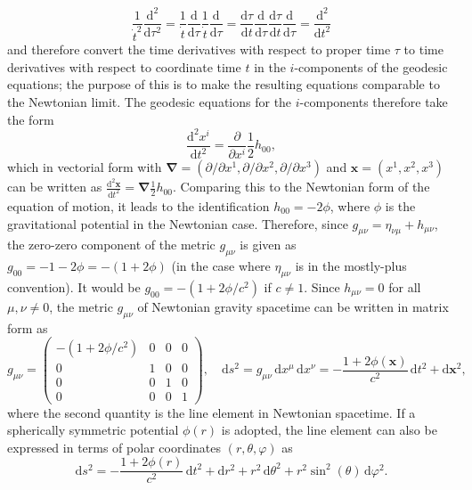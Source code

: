 \documentclass[a4paper,11pt]{article}
\numberwithin{equation}{section}
\newcommand\vect[1]{\ensuremath{\bm{#1}}}
\begin{document}
{\begin{equation}
\frac{1}{\dot{t}^2}\frac{\mathrm{d}^2}{\mathrm{d}\tau^2} = \frac{1}{\dot{t}}\frac{\mathrm{d}}{\mathrm{d}\tau}\frac{1}{\dot{t}}\frac{\mathrm{d}}{\mathrm{d}\tau} = \frac{\mathrm{d}\tau}{\mathrm{d}t}\frac{\mathrm{d}}{\mathrm{d}\tau}\frac{\mathrm{d}\tau}{\mathrm{d}t}\frac{\mathrm{d}}{\mathrm{d}\tau} = \frac{\mathrm{d}^2}{\mathrm{d}t^2}
\end{equation} and therefore convert the time derivatives with respect to proper time $\tau$ to time derivatives with respect to coordinate time $t$ in the $i$-components of the geodesic equations; the purpose of this is to make the resulting equations comparable to the Newtonian limit. The geodesic equations for the $i$-components therefore take the form \begin{equation}
\frac{\mathrm{d}^2x^i}{\mathrm{d}t^2} = \frac{\partial}{\partial x^i} \frac{1}{2}h_{00}, 
\end{equation} which in vectorial form with $\vect{\nabla} = (\partial/\partial x^1, \partial/\partial x^2, \partial/\partial x^3)$ and $\vect{x} = (x^1,x^2,x^3)$ can be written as $\frac{\mathrm{d}^2\vect{x}}{\mathrm{d}t^2} = \vect{\nabla}\frac{1}{2}h_{00}$. Comparing this to the Newtonian form of the equation of motion, it leads to the identification $h_{00} = -2\phi$, where $\phi$ is the gravitational potential in the Newtonian case. Therefore, since $g_{\mu\nu} = \eta_{\nu\mu} + h_{\mu\nu}$, the zero-zero component of the metric $g_{\mu\nu}$ is given as $g_{00} = -1 -2\phi = -(1+2\phi)$ (in the case where $\eta_{\mu\nu}$ is in the mostly-plus convention). It would be $g_{00} = -(1+2\phi/c^2)$ if $c \neq 1$. Since $h_{\mu\nu} = 0$ for all $\mu,\nu \neq 0$, the metric $g_{\mu\nu}$ of Newtonian gravity spacetime can be written in matrix form as \begin{equation}
g_{\mu\nu} = \begin{pmatrix}
-(1+2\phi/c^2) & 0 & 0 & 0 \\
0 & 1 & 0 & 0 \\
0 & 0 & 1 & 0 \\
0 & 0 & 0 & 1
\end{pmatrix}, \quad \mathrm{d}s^2 = g_{\mu\nu}\,\mathrm{d}x^\mu\,\mathrm{d}x^\nu = -\frac{1+2\phi(\vect{x})}{c^2}\,\mathrm{d}t^2 + \mathrm{d}\vect{x}^2,
\end{equation} where the second quantity is the line element in Newtonian spacetime. If a spherically symmetric potential $\phi(r)$ is adopted, the line element can also be expressed in terms of polar coordinates $(r,\theta,\varphi)$ as \begin{equation}
\mathrm{d}s^2 = -\frac{1+2\phi(r)}{c^2}\,\mathrm{d}t^2 + \mathrm{d}r^2 + r^2\,\mathrm{d}\theta^2 + r^2\sin^2(\theta)\,\mathrm{d}\varphi^2.
\end{equation}
}
\end{document}

